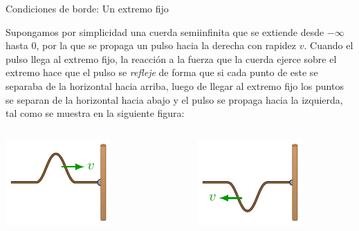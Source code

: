 \documentclass[11pt,handout,aspectratio=1610]{beamer}
\begin{document}
\begin{frame}{Condiciones de borde: Un extremo fijo}

    Supongamos por simplicidad una cuerda semiinfinita que se extiende desde $-\infty$ hasta $0$, por la que se propaga un pulso hacia la derecha con rapidez $v$. Cuando el pulso llega al extremo fijo, la reacción a la fuerza que la cuerda ejerce sobre el extremo hace que el pulso se \emph{refleje} de forma que si cada punto de este se separaba de la horizontal hacia arriba, luego de llegar al extremo fijo los puntos se separan de la horizontal hacia abajo y el pulso se propaga hacia la izquierda, tal como se muestra en la siguiente figura:
    \begin{columns}
        \begin{column}{0.4\textwidth}
            \includegraphics[width=\textwidth]{../figs/waves_reflection_transmission-1.pdf}
        \end{column}
        ~
        \begin{column}{0.4\textwidth}
            \includegraphics[width=\textwidth]{../figs/waves_reflection_transmission-2.pdf}
        \end{column}
    \end{columns}


\end{frame}
\end{document}
